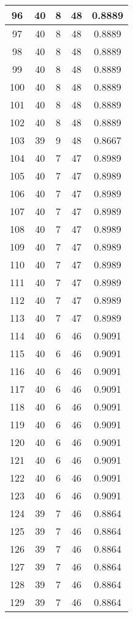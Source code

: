 \documentclass[letterpaper, 12pt]{article}
\begin{document}
\begin{longtable}{|c|c|c|c|c|}
\hline
96 & 40 & 8 & 48 & 0.8889 \\
\hline
97 & 40 & 8 & 48 & 0.8889 \\
\hline
98 & 40 & 8 & 48 & 0.8889 \\
\hline
99 & 40 & 8 & 48 & 0.8889 \\
\hline
100 & 40 & 8 & 48 & 0.8889 \\
\hline
101 & 40 & 8 & 48 & 0.8889 \\
\hline
102 & 40 & 8 & 48 & 0.8889 \\
\hline
103 & 39 & 9 & 48 & 0.8667 \\
\hline
104 & 40 & 7 & 47 & 0.8989 \\
\hline
105 & 40 & 7 & 47 & 0.8989 \\
\hline
106 & 40 & 7 & 47 & 0.8989 \\
\hline
107 & 40 & 7 & 47 & 0.8989 \\
\hline
108 & 40 & 7 & 47 & 0.8989 \\
\hline
109 & 40 & 7 & 47 & 0.8989 \\
\hline
110 & 40 & 7 & 47 & 0.8989 \\
\hline
111 & 40 & 7 & 47 & 0.8989 \\
\hline
112 & 40 & 7 & 47 & 0.8989 \\
\hline
113 & 40 & 7 & 47 & 0.8989 \\
\hline
114 & 40 & 6 & 46 & 0.9091 \\
\hline
115 & 40 & 6 & 46 & 0.9091 \\
\hline
116 & 40 & 6 & 46 & 0.9091 \\
\hline
117 & 40 & 6 & 46 & 0.9091 \\
\hline
118 & 40 & 6 & 46 & 0.9091 \\
\hline
119 & 40 & 6 & 46 & 0.9091 \\
\hline
120 & 40 & 6 & 46 & 0.9091 \\
\hline
121 & 40 & 6 & 46 & 0.9091 \\
\hline
122 & 40 & 6 & 46 & 0.9091 \\
\hline
123 & 40 & 6 & 46 & 0.9091 \\
\hline
124 & 39 & 7 & 46 & 0.8864 \\
\hline
125 & 39 & 7 & 46 & 0.8864 \\
\hline
126 & 39 & 7 & 46 & 0.8864 \\
\hline
127 & 39 & 7 & 46 & 0.8864 \\
\hline
128 & 39 & 7 & 46 & 0.8864 \\
\hline
129 & 39 & 7 & 46 & 0.8864 \\

\end{longtable}
\end{document}
